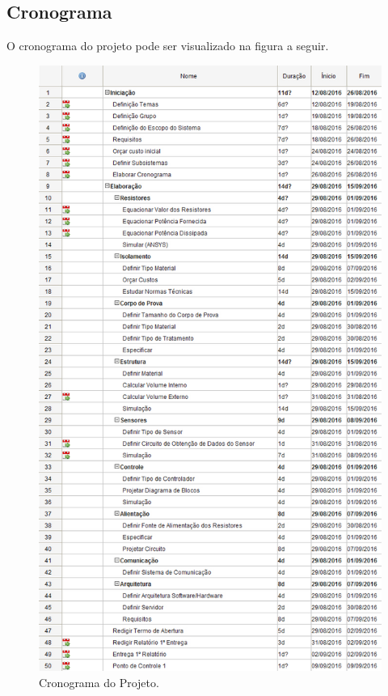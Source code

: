 \subsection{Cronograma}

O cronograma do projeto pode ser visualizado na figura a seguir.

\begin{figure}[!ht]
	\centering
	\label{cronograma}
	\includegraphics[keepaspectratio=true,scale=0.6]{figuras/cronograma.jpg}
	\caption{Cronograma do Projeto.}
\end{figure}

